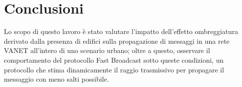 
\chapter{Conclusioni}\label{chap:conclusioni}
Lo scopo di questo lavoro è stato valutare l'impatto dell'effetto ombreggiatura derivato dalla
presenza di edifici sulla propagazione di messaggi in una rete VANET all'intero di uno scenario urbano;
oltre a questo, osservare il comportamento del protocollo Fast Broadcast sotto queste condizioni,
un protocollo che stima dinamicamente il raggio trasmissivo per propagare il messaggio
con meno salti possibile.
